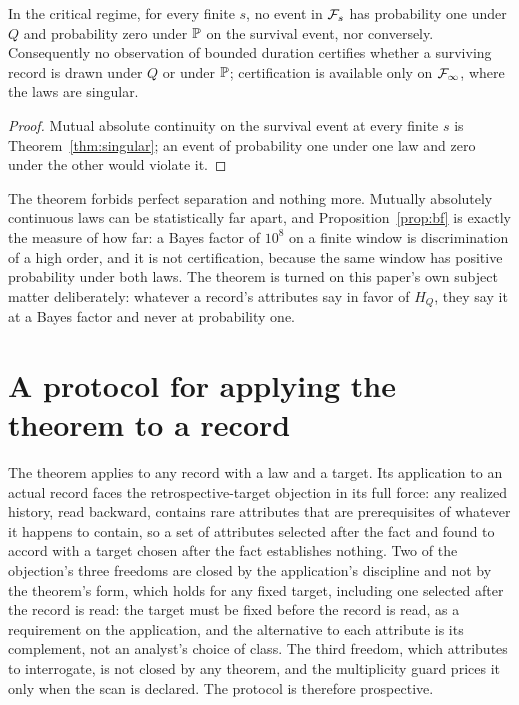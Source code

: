 \begin{theorem}\label{thm:ceiling}
In the critical regime, for every finite $s$, no event in $\mathcal{F}_s$ has
probability one under $Q$ and probability zero under $\mathbb{P}$ on the
survival event, nor conversely. Consequently no observation of bounded
duration certifies whether a surviving record is drawn under $Q$ or under
$\mathbb{P}$; certification is available only on $\mathcal{F}_\infty$, where the laws are
singular.
\end{theorem}

\begin{proof}
Mutual absolute continuity on the survival event at every finite $s$ is
Theorem~\ref{thm:singular}; an event of probability one under one law and
zero under the other would violate it.
\end{proof}

\begin{remark}\label{rem:certify}
The theorem forbids perfect separation and nothing more. Mutually
absolutely continuous laws can be statistically far apart, and
Proposition~\ref{prop:bf} is exactly the measure of how far: a Bayes
factor of $10^{8}$ on a finite window is discrimination of a high order,
and it is not certification, because the same window has positive
probability under both laws. The theorem is turned on this paper's own
subject matter deliberately: whatever a record's attributes say in favor
of $H_Q$, they say it at a Bayes factor and never at probability one.
\end{remark}

\section{A protocol for applying the theorem to a record}
\label{sec:protocol}

The theorem applies to any record with a law and a target. Its
application to an actual record faces the retrospective-target objection
in its full force: any realized history, read backward, contains rare
attributes that are prerequisites of whatever it happens to contain, so a
set of attributes selected after the fact and found to accord with a
target chosen after the fact establishes nothing. Two of the objection's three freedoms are closed by the application's discipline and not by the theorem's form, which holds for any fixed target, including one selected after the record is read: the target must be fixed before the record is read, as a requirement on the application, and the alternative to each attribute is its
complement, not an analyst's choice of class. The third freedom, which
attributes to interrogate, is not closed by any theorem, and the
multiplicity guard prices it only when the scan is declared. The protocol
is therefore prospective.

